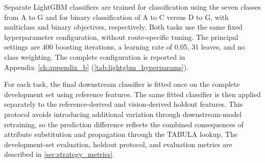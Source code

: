 Separate LightGBM classifiers are trained for classification using the seven classes from A to G and for binary classification of A to C versus D to G, with multiclass and binary objectives, respectively.
Both tasks use the same fixed hyperparameter configuration, without route-specific tuning.
The principal settings are 400 boosting iterations, a learning rate of 0.05, 31 leaves, and no class weighting.
The complete configuration is reported in Appendix~\ref{ch:appendix_b} (\cref{tab:lightgbm_hyperparams}).

For each task, the final downstream classifier is fitted once on the complete development set using reference features.
The same fitted classifier is then applied separately to the reference-derived and vision-derived holdout features.
This protocol avoids introducing additional variation through downstream-model retraining, so the prediction difference reflects the combined consequences of attribute substitution and propagation through the TABULA lookup.
The development-set evaluation, holdout protocol, and evaluation metrics are described in \cref{sec:strategy_metrics}.
